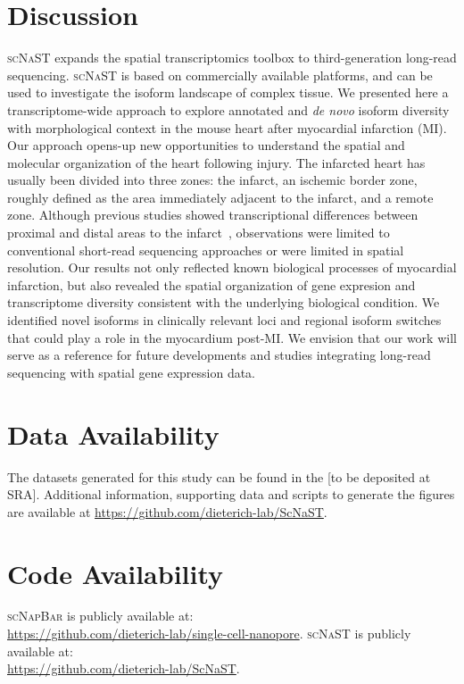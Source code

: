 \documentclass[utf8]{FrontiersinHarvard} %
\newcommand{\denovo}{\textit{de novo}\xspace}
\newcommand{\scn}{\textsc{scNapBar}\xspace}
\newcommand{\scnast}{\textsc{scNaST}\xspace}
\begin{document}
\section*{Discussion}
\scnast expands the spatial transcriptomics toolbox to third-generation long-read sequencing.
\scnast is based on commercially available platforms, and can be used to investigate the isoform landscape of complex tissue.
We presented here a transcriptome-wide approach to explore annotated and \denovo isoform diversity with morphological context in the mouse heart after myocardial infarction (MI).
Our approach opens-up new opportunities to understand the spatial and molecular organization of the heart following injury.
The infarcted heart has usually been divided into three zones: the infarct, an ischemic border zone, roughly defined as the area immediately adjacent to the infarct, and a remote zone. 
Although previous studies showed transcriptional differences between proximal and distal areas to the infarct~\citep{Duijvenboden2019:border_zone}, observations were limited to conventional short-read sequencing approaches or were limited in spatial resolution.
Our results not only reflected known biological processes of myocardial infarction, but also revealed the spatial organization of gene expresion and transcriptome diversity consistent with the underlying biological condition.
We identified novel isoforms in clinically relevant loci and regional isoform switches that could play a role in the myocardium post-MI.
We envision that our work will serve as a reference for future developments and studies integrating long-read sequencing with spatial gene expression data.



\section*{Data Availability}
The datasets generated for this study can be found in the [to be deposited at SRA].
Additional information, supporting data and scripts to generate the figures are available at \url{https://github.com/dieterich-lab/ScNaST}.

\section*{Code Availability}
\scn is publicly available at:\\ \url{https://github.com/dieterich-lab/single-cell-nanopore}.
\scnast is publicly available at:\\ \url{https://github.com/dieterich-lab/ScNaST}.
\end{document}
